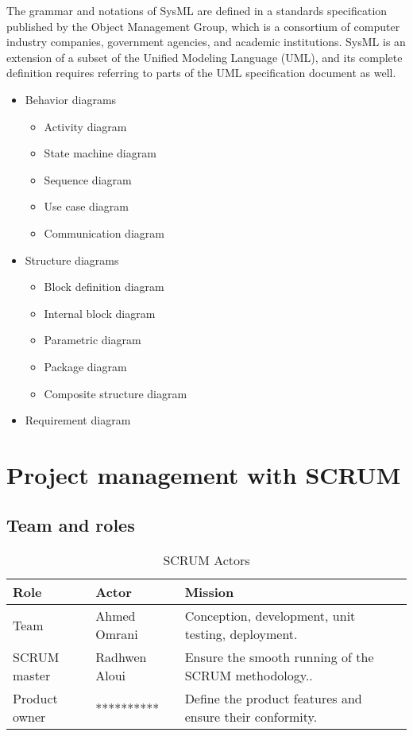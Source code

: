 The grammar and notations of SysML are defined in a standards specification published by the Object Management Group, which is a consortium of computer industry companies, government agencies, and academic institutions. SysML is an extension of a subset of the Unified Modeling Language (UML), and its complete definition requires referring to parts of the UML specification document as well.\cite{LD13}
\begin{itemize}
\item Behavior diagrams\cite{LD13}
\begin{itemize}
\item Activity diagram
\item State machine diagram
\item Sequence diagram
\item Use case diagram
\item Communication diagram
\end{itemize}
\item Structure diagrams\cite{LD13}
\begin{itemize}
\item Block definition diagram
\item Internal block diagram
\item Parametric diagram
\item Package diagram
\item Composite structure diagram
\end{itemize}
\item Requirement diagram\cite{LD13}
\end{itemize}
\vspace{1em}

\section{Project management with SCRUM }
\subsection{Team and roles}
\begin{table}[!ht]
  \centering
  \begin{tabular}{|l|l|p{9cm}|}
    \hline
    Role & Actor & Mission \\
    \hline
    Team & Ahmed Omrani &Conception, development, unit testing, deployment. \\
    \hline
    SCRUM master & Radhwen Aloui &Ensure the smooth running of the SCRUM methodology.. \\
    \hline
    Product owner & ********** &Define the product features and ensure their conformity. \\
    \hline
  \end{tabular}
  \caption{SCRUM Actors}\label{ActScrum}
\end{table}

